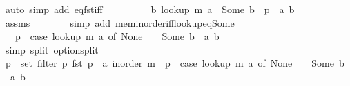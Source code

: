 \begin{isabellebody}
\ {\isacharparenleft}{\kern0pt}auto\ simp\ add{\isacharcolon}{\kern0pt}\ eq{\isacharunderscore}{\kern0pt}fst{\isacharunderscore}{\kern0pt}iff{\isacharparenright}{\kern0pt}\isanewline
\ \ \ \ \isamarkupfalse%
\ \isamarkupfalse%
\ {\isachardoublequoteopen}{\isachardot}{\kern0pt}{\isachardot}{\kern0pt}{\isachardot}{\kern0pt}\ {\isasymlongleftrightarrow}\ {\isacharparenleft}{\kern0pt}{\isasymexists}b{\isachardot}{\kern0pt}\ lookup\ m\ a\ {\isacharequal}{\kern0pt}\ Some\ b\ {\isasymand}\ p\ {\isacharequal}{\kern0pt}\ {\isacharparenleft}{\kern0pt}a{\isacharcomma}{\kern0pt}\ b{\isacharparenright}{\kern0pt}{\isacharparenright}{\kern0pt}{\isachardoublequoteclose}\isanewline
\ \ \ \ \ \ \isamarkupfalse%
\ assms\isanewline
\ \ \ \ \ \ \isamarkupfalse%
\ {\isacharparenleft}{\kern0pt}simp\ add{\isacharcolon}{\kern0pt}\ mem{\isacharunderscore}{\kern0pt}inorder{\isacharunderscore}{\kern0pt}iff{\isacharunderscore}{\kern0pt}lookup{\isacharunderscore}{\kern0pt}eq{\isacharunderscore}{\kern0pt}Some{\isacharparenright}{\kern0pt}\isanewline
\ \ \ \ \isamarkupfalse%
\ \isamarkupfalse%
\ {\isachardoublequoteopen}{\isachardot}{\kern0pt}{\isachardot}{\kern0pt}{\isachardot}{\kern0pt}\ {\isasymlongleftrightarrow}\ p\ {\isasymin}\ {\isacharparenleft}{\kern0pt}case\ lookup\ m\ a\ of\ None\ {\isasymRightarrow}\ {\isacharbraceleft}{\kern0pt}{\isacharbraceright}{\kern0pt}\ {\isacharbar}{\kern0pt}\ Some\ b\ {\isasymRightarrow}\ {\isacharbraceleft}{\kern0pt}{\isacharparenleft}{\kern0pt}a{\isacharcomma}{\kern0pt}\ b{\isacharparenright}{\kern0pt}{\isacharbraceright}{\kern0pt}{\isacharparenright}{\kern0pt}{\isachardoublequoteclose}\isanewline
\ \ \ \ \ \ \isamarkupfalse%
\ {\isacharparenleft}{\kern0pt}simp\ split{\isacharcolon}{\kern0pt}\ option{\isachardot}{\kern0pt}split{\isacharparenright}{\kern0pt}\isanewline
\ \ \ \ \isamarkupfalse%
\ \isamarkupfalse%
\ {\isachardoublequoteopen}p\ {\isasymin}\ set\ {\isacharparenleft}{\kern0pt}filter\ {\isacharparenleft}{\kern0pt}{\isasymlambda}p{\isachardot}{\kern0pt}\ fst\ p\ {\isacharequal}{\kern0pt}\ a{\isacharparenright}{\kern0pt}\ {\isacharparenleft}{\kern0pt}inorder\ m{\isacharparenright}{\kern0pt}{\isacharparenright}{\kern0pt}\ {\isasymlongleftrightarrow}\ p\ {\isasymin}\ {\isacharparenleft}{\kern0pt}case\ lookup\ m\ a\ of\ None\ {\isasymRightarrow}\ {\isacharbraceleft}{\kern0pt}{\isacharbraceright}{\kern0pt}\ {\isacharbar}{\kern0pt}\ Some\ b\ {\isasymRightarrow}\ {\isacharbraceleft}{\kern0pt}{\isacharparenleft}{\kern0pt}a{\isacharcomma}{\kern0pt}\ b{\isacharparenright}{\kern0pt}{\isacharbraceright}{\kern0pt}{\isacharparenright}{\kern0pt}{\isachardoublequoteclose}\isanewline

\end{isabellebody}
